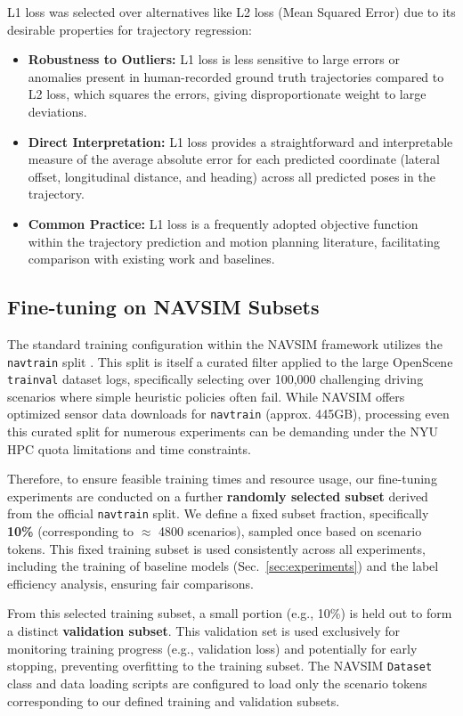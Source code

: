 \documentclass{article}
\begin{document}
L1 loss was selected over alternatives like L2 loss (Mean Squared Error) due to its desirable properties for trajectory regression:
\begin{itemize}
    \item \textbf{Robustness to Outliers:} L1 loss is less sensitive to large errors or anomalies present in human-recorded ground truth trajectories compared to L2 loss, which squares the errors, giving disproportionate weight to large deviations.
    \item \textbf{Direct Interpretation:} L1 loss provides a straightforward and interpretable measure of the average absolute error for each predicted coordinate (lateral offset, longitudinal distance, and heading) across all predicted poses in the trajectory.
    \item \textbf{Common Practice:} L1 loss is a frequently adopted objective function within the trajectory prediction and motion planning literature, facilitating comparison with existing work and baselines.
\end{itemize}

\subsection{Fine-tuning on NAVSIM Subsets}
\label{subsec:subset}
The standard training configuration within the NAVSIM framework utilizes the \texttt{navtrain} split \cite{dauner2024navsim}. This split is itself a curated filter applied to the large OpenScene \texttt{trainval} dataset logs, specifically selecting over 100,000 challenging driving scenarios where simple heuristic policies often fail. While NAVSIM offers optimized sensor data downloads for \texttt{navtrain} (approx. 445GB), processing even this curated split for numerous experiments can be demanding under the NYU HPC quota limitations and time constraints.

Therefore, to ensure feasible training times and resource usage, our fine-tuning experiments are conducted on a further \textbf{randomly selected subset} derived from the official \texttt{navtrain} split. We define a fixed subset fraction, specifically \textbf{10\%} (corresponding to \(\approx\) 4800 scenarios), sampled once based on scenario tokens. This fixed training subset is used consistently across all experiments, including the training of baseline models (Sec.~\ref{sec:experiments}) and the label efficiency analysis, ensuring fair comparisons.

From this selected training subset, a small portion (e.g., 10\%) is held out to form a distinct \textbf{validation subset}. This validation set is used exclusively for monitoring training progress (e.g., validation loss) and potentially for early stopping, preventing overfitting to the training subset. The NAVSIM \texttt{Dataset} class and data loading scripts are configured to load only the scenario tokens corresponding to our defined training and validation subsets.
\end{document}
